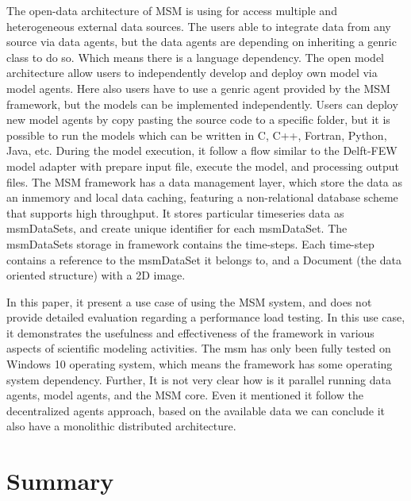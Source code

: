 The open-data architecture of MSM is using for access multiple and heterogeneous external data sources. The users able to integrate data from any source via data agents, but the data agents are depending on inheriting a genric class to do so. Which means there is a language dependency. The open model architecture allow users to independently develop and deploy own model via model agents. Here also users have to use a genric agent provided by the MSM framework, but the models can be implemented independently. Users can deploy new model agents by copy pasting the source code to a specific folder, but it is possible to run the models which can be written in C, C++, Fortran, Python, Java, etc. During the model execution, it follow a flow similar to the Delft-FEW model adapter with prepare input file, execute the model, and processing output files. The MSM framework has a data management layer, which store the data as an inmemory and local data caching, featuring a non-relational database scheme that supports high throughput. It stores particular timeseries data as msmDataSets, and create unique identifier for each msmDataSet. 
The msmDataSets storage in framework contains the time-steps. Each time-step contains a reference to the msmDataSet it belongs to, and a Document (the data oriented structure) with a 2D image.

In this paper, it present a use case of using the MSM system, and does not provide detailed evaluation regarding a performance load testing. In this use case, it demonstrates the usefulness and effectiveness of the framework in various aspects of scientific modeling activities. The msm has only been fully tested on Windows 10 operating system, which means the framework has some operating system dependency. Further, It is not very clear how is it parallel running data agents, model agents, and the MSM core. Even it mentioned it follow the decentralized agents approach, based on the available data we can conclude it also have a monolithic distributed architecture.

\section{Summary}
\label{se:lit_summary}

